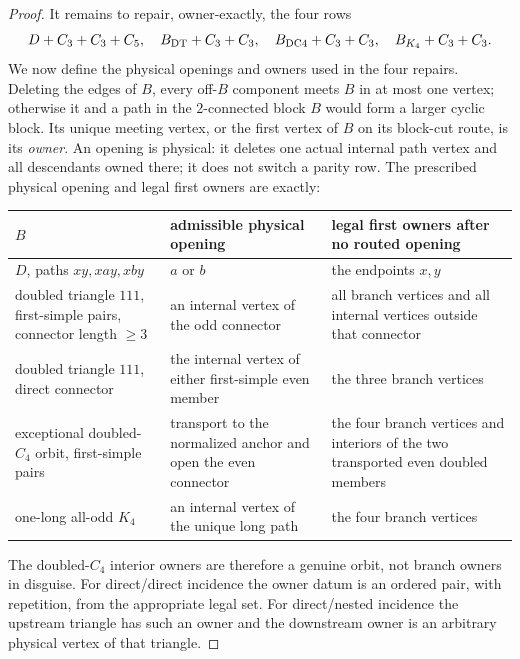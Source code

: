 \documentclass[11pt]{article}
\theoremstyle{remark}
\begin{document}
\begin{proof}
It remains to repair, owner-exactly, the four rows
\begin{equation}\label{eq:four}
 D+C_3+C_3+C_5,
 \quad B_{\rm DT}+C_3+C_3,
 \quad B_{\rm DC4}+C_3+C_3,
 \quad B_{K_4}+C_3+C_3.
\end{equation}
We now define the physical openings and owners used in the four repairs.
Deleting the edges of $B$, every off-$B$ component meets $B$ in at most one
vertex; otherwise it and a path in the $2$-connected block $B$ would form a
larger cyclic block.  Its unique meeting vertex, or the first vertex of $B$ on
its block-cut route, is its \emph{owner}.  An opening is physical: it deletes
one actual internal path vertex and all descendants owned there; it does not
switch a parity row.  The prescribed physical opening and legal first owners
are exactly:
\begin{center}
\small
\begin{tabular}{p{3.2cm}p{4.7cm}p{5.2cm}}
\toprule
$B$&admissible physical opening&legal first owners after no routed opening\\
\midrule
$D$, paths $xy,xay,xby$&$a$ or $b$&the endpoints $x,y$\\
doubled triangle $111$, first-simple pairs, connector length $\ge3$&an internal
vertex of the odd connector&all branch vertices and all internal vertices
outside that connector\\
doubled triangle $111$, direct connector&the internal vertex of either
first-simple even member&the three branch vertices\\
exceptional doubled-$C_4$ orbit, first-simple pairs&transport to the normalized
anchor and open the even connector&the four branch vertices and interiors of
the two transported even doubled members\\
one-long all-odd $K_4$&an internal vertex of the unique long path&the four
branch vertices\\
\bottomrule
\end{tabular}
\end{center}
The doubled-$C_4$ interior owners are therefore a genuine orbit, not branch
owners in disguise.  For direct/direct incidence the owner datum is an ordered
pair, with repetition, from the appropriate legal set.  For direct/nested
incidence the upstream triangle has such an owner and the downstream owner is
an arbitrary physical vertex of that triangle.


\end{proof}
\end{document}

